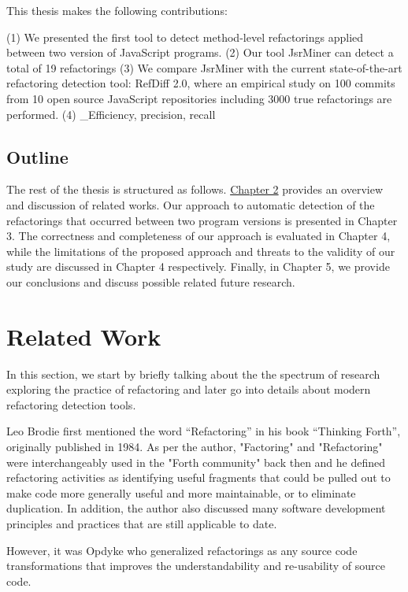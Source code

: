 \documentclass[letterpaper,12pt,onecolumn,final]{report}
\begin{document}
This thesis makes the following contributions:

(1) We presented the first tool to detect method-level refactorings applied between two version of JavaScript programs. 
(2) Our tool JsrMiner can detect a total of 19 refactorings
(3) We compare JsrMiner with the current state-of-the-art refactoring detection tool: RefDiff 2.0, where an empirical study on 100 commits from 10 open source JavaScript repositories including 3000 true refactorings are performed.
(4) \_Efficiency, precision, recall


\section{Outline}
\label{sec:outline}
The rest of the thesis is structured as follows. \hyperref[chap:relatedWork]{Chapter 2}  provides an overview and discussion of related works. Our approach to automatic detection of the refactorings that occurred between two program versions is presented in Chapter 3. The correctness and completeness of our approach is evaluated in Chapter 4, while the limitations of the proposed approach and threats to the validity of our study are discussed in Chapter 4 respectively. Finally, in Chapter 5, we provide our conclusions and discuss possible related future research.



\chapter{Related Work}
\label{chap:relatedwork}

In this section, we start by briefly talking about the the spectrum of research exploring the practice of refactoring and later go into details about modern refactoring detection tools.

Leo Brodie \cite{thinkingforth} first mentioned the word “Refactoring” in his book “Thinking Forth”, originally published in 1984. As per the author, "Factoring" and "Refactoring" were interchangeably used in the "Forth community" back then and he defined refactoring activities as identifying useful fragments that could be pulled out to make code more generally useful and more maintainable, or to eliminate duplication. In addition, the author also discussed many software development principles and practices that are still applicable to date.

However, it was Opdyke \cite{OPDYKE1990} who generalized refactorings as any source code transformations that improves the understandability and re-usability of source code.
\end{document}
